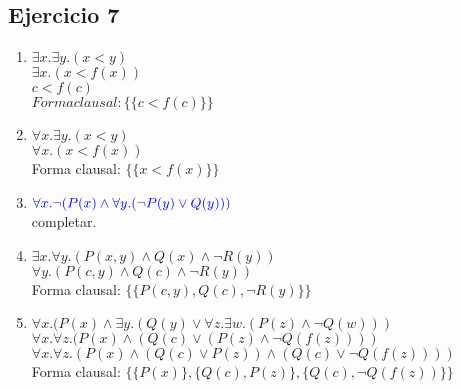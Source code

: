 \documentclass[10pt,a4paper]{article}
\begin{document}
\subsection{Ejercicio 7}
    \begin{enumerate}
        \item 
        $\exists x. \exists y. (x<y)$ \\
        $\exists x. (x<f(x))$ \\
        $c<f(c)$ \\
        $Forma clausal: \{\{c<f(c)\}\}$
        \item 
        $\forall x. \exists y. (x<y)$ \\
        $\forall x. (x<f(x))$ \\
        Forma clausal: $\{\{x<f(x)\}\}$
        \item 
        ${\color{blue}\forall x. \lnot(P(x) \land \forall y.(\lnot P(y) \lor Q(y)))}$ \\
        completar.
        \item 
        $\exists x. \forall y. (P(x,y) \land Q(x) \land \lnot R(y))$ \\
        $\forall y. (P(c,y) \land Q(c) \land \lnot R(y))$ \\
        Forma clausal: $\{\{P(c,y), Q(c), \lnot R(y)\}\}$
        \item 
        $\forall x. (P(x) \land \exists y. (Q(y) \lor \forall z. \exists w. (P(z) \land \lnot Q(w)))$ \\
        $\forall x. \forall z. (P(x) \land (Q(c) \lor (P(z) \land \lnot Q(f(z))))$ \\
        $\forall x. \forall z. (P(x) \land (Q(c) \lor P(z) ) \land (Q(c) \lor \lnot Q(f(z)) ) )$ \\
        Forma clausal: $\{\{ P(x)\} , \{Q(c), P(z)\} , \{Q(c), \lnot Q(f(z))\} \}$
    \end{enumerate}
\end{document}
